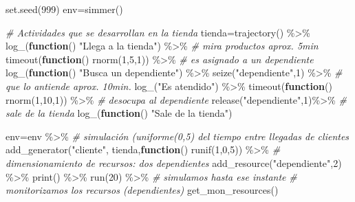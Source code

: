 \documentclass[
]{book}
\newenvironment{Shaded}{\begin{snugshade}}{\end{snugshade}}
\newcommand{\CommentTok}[1]{\textcolor[rgb]{0.56,0.35,0.01}{\textit{#1}}}
\newcommand{\ControlFlowTok}[1]{\textcolor[rgb]{0.13,0.29,0.53}{\textbf{#1}}}
\newcommand{\DecValTok}[1]{\textcolor[rgb]{0.00,0.00,0.81}{#1}}
\newcommand{\FunctionTok}[1]{\textcolor[rgb]{0.00,0.00,0.00}{#1}}
\newcommand{\NormalTok}[1]{#1}
\newcommand{\OtherTok}[1]{\textcolor[rgb]{0.56,0.35,0.01}{#1}}
\newcommand{\SpecialCharTok}[1]{\textcolor[rgb]{0.00,0.00,0.00}{#1}}
\newcommand{\StringTok}[1]{\textcolor[rgb]{0.31,0.60,0.02}{#1}}
\theoremstyle{definition}
\theoremstyle{definition}
\theoremstyle{definition}
\theoremstyle{definition}
\theoremstyle{remark}
\begin{document}
\begin{Shaded}
\begin{Highlighting}[]
\FunctionTok{set.seed}\NormalTok{(}\DecValTok{999}\NormalTok{)}
\NormalTok{env}\OtherTok{=}\FunctionTok{simmer}\NormalTok{()}

\CommentTok{\# Actividades que se desarrollan en la tienda}
\NormalTok{tienda}\OtherTok{=}\FunctionTok{trajectory}\NormalTok{() }\SpecialCharTok{\%\textgreater{}\%}
  \FunctionTok{log\_}\NormalTok{(}\ControlFlowTok{function}\NormalTok{()  }\StringTok{"Llega a la tienda"}\NormalTok{) }\SpecialCharTok{\%\textgreater{}\%}
  \CommentTok{\# mira productos aprox. 5min}
  \FunctionTok{timeout}\NormalTok{(}\ControlFlowTok{function}\NormalTok{() }\FunctionTok{rnorm}\NormalTok{(}\DecValTok{1}\NormalTok{,}\DecValTok{5}\NormalTok{,}\DecValTok{1}\NormalTok{)) }\SpecialCharTok{\%\textgreater{}\%} 
  \CommentTok{\# es asignado a un dependiente }
  \FunctionTok{log\_}\NormalTok{(}\ControlFlowTok{function}\NormalTok{() }\StringTok{"Busca un dependiente"}\NormalTok{) }\SpecialCharTok{\%\textgreater{}\%}
  \FunctionTok{seize}\NormalTok{(}\StringTok{"dependiente"}\NormalTok{,}\DecValTok{1}\NormalTok{) }\SpecialCharTok{\%\textgreater{}\%}
  \CommentTok{\# que lo antiende aprox. 10min.}
  \FunctionTok{log\_}\NormalTok{(}\StringTok{"Es atendido"}\NormalTok{) }\SpecialCharTok{\%\textgreater{}\%}
  \FunctionTok{timeout}\NormalTok{(}\ControlFlowTok{function}\NormalTok{() }\FunctionTok{rnorm}\NormalTok{(}\DecValTok{1}\NormalTok{,}\DecValTok{10}\NormalTok{,}\DecValTok{1}\NormalTok{)) }\SpecialCharTok{\%\textgreater{}\%}
  \CommentTok{\# desocupa al dependiente}
  \FunctionTok{release}\NormalTok{(}\StringTok{"dependiente"}\NormalTok{,}\DecValTok{1}\NormalTok{)}\SpecialCharTok{\%\textgreater{}\%}
  \CommentTok{\# sale de la tienda}
  \FunctionTok{log\_}\NormalTok{(}\ControlFlowTok{function}\NormalTok{() }\StringTok{"Sale de la tienda"}\NormalTok{)}

\NormalTok{env}\OtherTok{=}\NormalTok{env }\SpecialCharTok{\%\textgreater{}\%}
  \CommentTok{\# simulación (uniforme(0,5) del tiempo entre llegadas de clientes}
  \FunctionTok{add\_generator}\NormalTok{(}\StringTok{"cliente"}\NormalTok{, tienda,}\ControlFlowTok{function}\NormalTok{() }\FunctionTok{runif}\NormalTok{(}\DecValTok{1}\NormalTok{,}\DecValTok{0}\NormalTok{,}\DecValTok{5}\NormalTok{)) }\SpecialCharTok{\%\textgreater{}\%} 
  \CommentTok{\# dimensionamiento de recursos: dos dependientes}
  \FunctionTok{add\_resource}\NormalTok{(}\StringTok{"dependiente"}\NormalTok{,}\DecValTok{2}\NormalTok{) }\SpecialCharTok{\%\textgreater{}\%}  
  \FunctionTok{print}\NormalTok{() }\SpecialCharTok{\%\textgreater{}\%}
  \FunctionTok{run}\NormalTok{(}\DecValTok{20}\NormalTok{) }\SpecialCharTok{\%\textgreater{}\%} \CommentTok{\# simulamos hasta ese instante}
  \CommentTok{\# monitorizamos los recursos (dependientes)}
  \FunctionTok{get\_mon\_resources}\NormalTok{()}
\end{Highlighting}
\end{Shaded}
\end{document}
